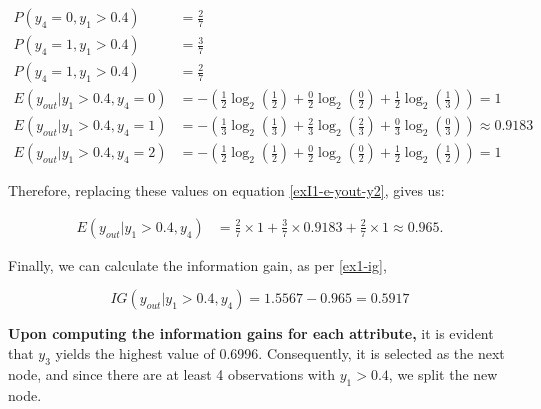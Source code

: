 \documentclass[12pt]{article}
\begin{document}
\begin{enumerate}[leftmargin=\labelsep]
    \[
        \begin{aligned}
            P(y_4 = 0, y_1 > 0.4)          & = \frac{2}{7}                                                                                       \\
            P(y_4 = 1, y_1 > 0.4)          & = \frac{3}{7}                                                                                       \\
            P(y_4 = 1, y_1 > 0.4)          & = \frac{2}{7}                                                                                       \\
            E(y_{out} | y_1 > 0.4 , y_4 = 0) & = - \left(\frac{1}{2} \log_2\left(\frac{1}{2}\right) + \frac{0}{2} \log_2\left(\frac{0}{2}\right)
                + \frac{1}{2} \log_2\left(\frac{1}{3}\right)\right) = 1                                                                          \\
            E(y_{out} | y_1 > 0.4 , y_4 = 1) & = - \left(\frac{1}{3} \log_2\left(\frac{1}{3}\right) + \frac{2}{3} \log_2\left(\frac{2}{3}\right)
                + \frac{0}{3} \log_2\left(\frac{0}{3}\right)\right) \approx 0.9183                                                               \\
            E(y_{out} | y_1 > 0.4 , y_4 = 2) & = - \left(\frac{1}{2} \log_2\left(\frac{1}{2}\right) + \frac{0}{2} \log_2\left(\frac{0}{2}\right)
                + \frac{1}{2} \log_2\left(\frac{1}{2}\right)\right) = 1
        \end{aligned}
    \]

    Therefore, replacing these values on equation \eqref{exI1-e-yout-y2}, gives us:

    \[
        \begin{aligned}
            E(y_{out} | y_1>0.4, y_4) & = \frac{2}{7} \times 1 + \frac{3}{7} \times 0.9183 +  \frac{2}{7} \times 1 \approx 0.965.
        \end{aligned}
    \]

    Finally, we can calculate the information gain, as per \eqref{ex1-ig},

    \[
        IG(y_{out} | y_1 > 0.4, y_{4}) = 1.5567 - 0.965 = 0.5917
    \]

    \textbf{Upon computing the information gains for each attribute,} it is evident that $y_3$ yields the highest value of 0.6996. Consequently,
        it is selected as the next node, and since there are at least 4 observations with $y_1 > 0.4$, we split the new node.


\end{enumerate}
\end{document}
